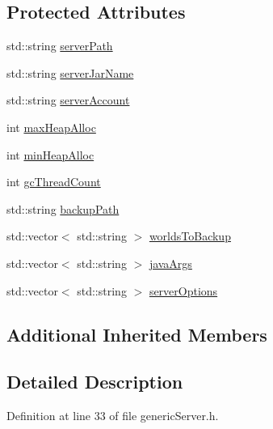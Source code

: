 \subsection*{Protected Attributes}
\begin{DoxyCompactItemize}
\item 
std\+::string \hyperlink{class_minecraft_server_service_1_1_generic_server_a10ccbcf30f81af95aa5e75726f2c1d80}{server\+Path}
\item 
std\+::string \hyperlink{class_minecraft_server_service_1_1_generic_server_add9023bc7c35b390e67507493449f7a5}{server\+Jar\+Name}
\item 
std\+::string \hyperlink{class_minecraft_server_service_1_1_generic_server_a0192c45acc976639f38aa7206586abcf}{server\+Account}
\item 
int \hyperlink{class_minecraft_server_service_1_1_generic_server_a025ace4dd732e9e1a3d47e695ebfabc1}{max\+Heap\+Alloc}
\item 
int \hyperlink{class_minecraft_server_service_1_1_generic_server_a75978615a6ba8576a5d97664ffd85142}{min\+Heap\+Alloc}
\item 
int \hyperlink{class_minecraft_server_service_1_1_generic_server_ad3e3e744983ef46efed8f5d2189e353f}{gc\+Thread\+Count}
\item 
std\+::string \hyperlink{class_minecraft_server_service_1_1_generic_server_a1f4d8509d45d7b8c6cb020499c1da17f}{backup\+Path}
\item 
std\+::vector$<$ std\+::string $>$ \hyperlink{class_minecraft_server_service_1_1_generic_server_a4add7010fca034d10e98ee0adb1c36cc}{worlds\+To\+Backup}
\item 
std\+::vector$<$ std\+::string $>$ \hyperlink{class_minecraft_server_service_1_1_generic_server_aed22e47eba34c39feb62ca62ad02dbb2}{java\+Args}
\item 
std\+::vector$<$ std\+::string $>$ \hyperlink{class_minecraft_server_service_1_1_generic_server_a1d5d6d5242a619f299427d18ab3969eb}{server\+Options}
\end{DoxyCompactItemize}
\subsection*{Additional Inherited Members}


\subsection{Detailed Description}


Definition at line 33 of file generic\+Server.\+h.



